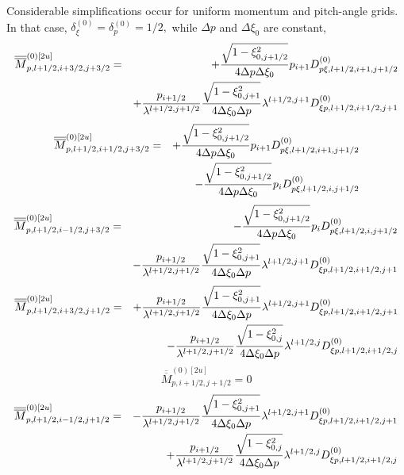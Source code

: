 Considerable simplifications occur for uniform momentum and pitch-angle
grids. In that case, $\delta _{\xi }^{\left( 0\right) }=\delta _{p}^{\left(
0\right) }=1/2,$ while $\Delta p$ and $\Delta \xi _{0}$ are constant, 
\begin{eqnarray}
\overline{\overline{M}}_{p,l+1/2,i+3/2,j+3/2}^{\left( 0\right) \left[ 2u%
\right] } &=&+\frac{\sqrt{1-\xi _{0,j+1/2}^{2}}}{4\Delta p\Delta \xi _{0}}%
p_{i+1}D_{p\xi ,l+1/2,i+1,j+1/2}^{\left( 0\right) }  \notag \\
&&+\frac{p_{i+1/2}}{\lambda ^{l+1/2,j+1/2}}\frac{\sqrt{1-\xi _{0,j+1}^{2}}}{%
4\Delta \xi _{0}\Delta p}\lambda ^{l+1/2,j+1}D_{\xi
p,l+1/2,i+1/2,j+1}^{\left( 0\right) }
\end{eqnarray}%
\begin{eqnarray}
\overline{\overline{M}}_{p,l+1/2,i+1/2,j+3/2}^{\left( 0\right) \left[ 2u%
\right] } &=&+\frac{\sqrt{1-\xi _{0,j+1/2}^{2}}}{4\Delta p\Delta \xi _{0}}%
p_{i+1}D_{p\xi ,l+1/2,i+1,j+1/2}^{\left( 0\right) }  \notag \\
&&-\frac{\sqrt{1-\xi _{0,j+1/2}^{2}}}{4\Delta p\Delta \xi _{0}}p_{i}D_{p\xi
,l+1/2,i,j+1/2}^{\left( 0\right) }
\end{eqnarray}%
\begin{eqnarray}
\overline{\overline{M}}_{p,l+1/2,i-1/2,j+3/2}^{\left( 0\right) \left[ 2u%
\right] } &=&-\frac{\sqrt{1-\xi _{0,j+1/2}^{2}}}{4\Delta p\Delta \xi _{0}}%
p_{i}D_{p\xi ,l+1/2,i,j+1/2}^{\left( 0\right) }  \notag \\
&&-\frac{p_{i+1/2}}{\lambda ^{l+1/2,j+1/2}}\frac{\sqrt{1-\xi _{0,j+1}^{2}}}{%
4\Delta \xi _{0}\Delta p}\lambda ^{l+1/2,j+1}D_{\xi
p,l+1/2,i+1/2,j+1}^{\left( 0\right) }
\end{eqnarray}%
\begin{eqnarray}
\overline{\overline{M}}_{p,l+1/2,i+3/2,j+1/2}^{\left( 0\right) \left[ 2u%
\right] } &=&+\frac{p_{i+1/2}}{\lambda ^{l+1/2,j+1/2}}\frac{\sqrt{1-\xi
_{0,j+1}^{2}}}{4\Delta \xi _{0}\Delta p}\lambda ^{l+1/2,j+1}D_{\xi
p,l+1/2,i+1/2,j+1}^{\left( 0\right) }  \notag \\
&&-\frac{p_{i+1/2}}{\lambda ^{l+1/2,j+1/2}}\frac{\sqrt{1-\xi _{0,j}^{2}}}{%
4\Delta \xi _{0}\Delta p}\lambda ^{l+1/2,j}D_{\xi p,l+1/2,i+1/2,j}^{\left(
0\right) }
\end{eqnarray}%
\begin{equation*}
\overline{\overline{M}}_{p,i+1/2,j+1/2}^{\left( 0\right) \left[ 2u\right] }=0
\end{equation*}%
\begin{eqnarray}
\overline{\overline{M}}_{p,l+1/2,i-1/2,j+1/2}^{\left( 0\right) \left[ 2u%
\right] } &=&-\frac{p_{i+1/2}}{\lambda ^{l+1/2,j+1/2}}\frac{\sqrt{1-\xi
_{0,j+1}^{2}}}{4\Delta \xi _{0}\Delta p}\lambda ^{l+1/2,j+1}D_{\xi
p,l+1/2,i+1/2,j+1}^{\left( 0\right) }  \notag \\
&&+\frac{p_{i+1/2}}{\lambda ^{l+1/2,j+1/2}}\frac{\sqrt{1-\xi _{0,j}^{2}}}{%
4\Delta \xi _{0}\Delta p}\lambda ^{l+1/2,j}D_{\xi p,l+1/2,i+1/2,j}^{\left(
0\right) }
\end{eqnarray}%
